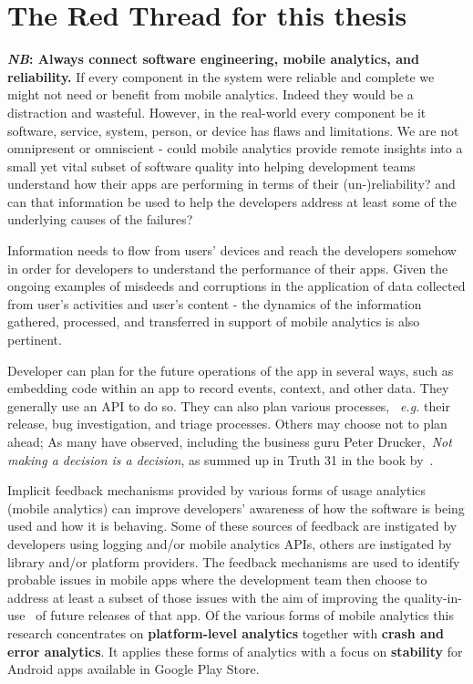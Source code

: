 \section{The Red Thread for this thesis}
\label{section_read_thread}
\textbf{\textit{NB}: Always connect software engineering, mobile analytics, and reliability.}
If every component in the system were reliable and complete we might not need or benefit from mobile analytics. Indeed they would be a distraction and wasteful. However, in the real-world every component be it software, service, system, person, or device has flaws and limitations. We are not omnipresent or omniscient - could mobile analytics provide remote insights into a small yet vital subset of software quality into helping development teams understand how their apps are performing in terms of their (un-)reliability? and can that information be used to help the developers address at least some of the underlying causes of the failures?

Information needs to flow from users' devices and reach the developers somehow in order for developers to understand the performance of their apps. Given the ongoing examples of misdeeds and corruptions in the application of data collected from user's activities and user's content - the dynamics of the information gathered, processed, and transferred in support of mobile analytics is also pertinent. 

Developer can plan for the future operations of the app in several ways, such as embedding code within an app to record events, context, and other data. They generally use an API to do so. They can also plan various processes, ~\emph{e.g.} their release, bug investigation, and triage processes. Others may choose not to plan ahead; As many have observed, including the business guru Peter Drucker,~\emph{Not making a decision is a decision}, as summed up in Truth 31 in the book by~\cite{gunther2013truth_about_better_decision_making}.

Implicit feedback mechanisms provided by various forms of usage analytics (mobile analytics) can improve developers' awareness of how the software is being used and how it is behaving. Some of these sources of feedback are instigated by developers using logging and/or mobile analytics APIs, others are instigated by library and/or platform providers. The feedback mechanisms are used to identify probable issues in mobile apps where the development team then choose to address at least a subset of those issues with the aim of improving the quality-in-use~\citep{} of future releases of that app. Of the various forms of mobile analytics this research concentrates on \textbf{platform-level analytics} together with \textbf{crash and error analytics}. It applies these forms of analytics with a focus on \textbf{stability} for Android apps available in Google Play Store.


